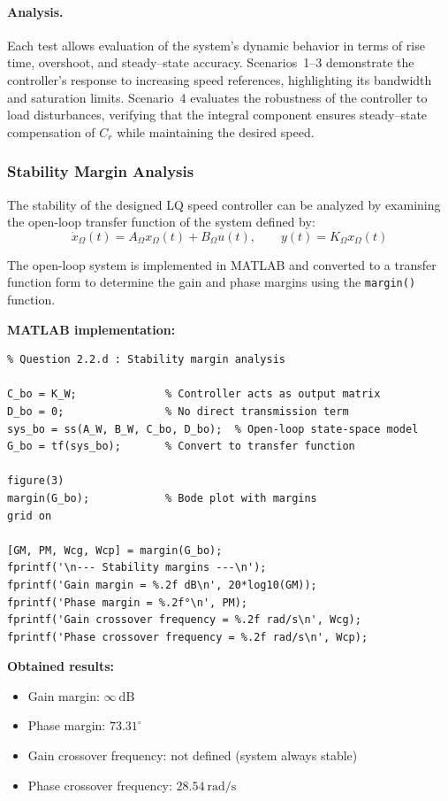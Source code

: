 \documentclass{rapportCS}
\begin{document}
\paragraph{Analysis.}
Each test allows evaluation of the system’s dynamic behavior in terms of rise time, overshoot, and steady–state accuracy.  
Scenarios~1–3 demonstrate the controller’s response to increasing speed references, highlighting its bandwidth and saturation limits.  
Scenario~4 evaluates the robustness of the controller to load disturbances, verifying that the integral component ensures steady–state compensation of $C_r$ while maintaining the desired speed.

\subsubsection{Stability Margin Analysis}

The stability of the designed LQ speed controller can be analyzed by examining the open-loop transfer function of the system defined by:
\begin{equation*}
\dot{x}_\Omega(t) = A_\Omega x_\Omega(t) + B_\Omega u(t),
\qquad
y(t) = K_\Omega x_\Omega(t)
\end{equation*}

The open-loop system is implemented in MATLAB and converted to a transfer function form to determine the gain and phase margins using the \texttt{margin()} function.

\noindent\textbf{MATLAB implementation:}
\begin{verbatim}
% Question 2.2.d : Stability margin analysis

C_bo = K_W;              % Controller acts as output matrix
D_bo = 0;                % No direct transmission term
sys_bo = ss(A_W, B_W, C_bo, D_bo);  % Open-loop state-space model
G_bo = tf(sys_bo);       % Convert to transfer function

figure(3)
margin(G_bo);            % Bode plot with margins
grid on

[GM, PM, Wcg, Wcp] = margin(G_bo);
fprintf('\n--- Stability margins ---\n');
fprintf('Gain margin = %.2f dB\n', 20*log10(GM));
fprintf('Phase margin = %.2f°\n', PM);
fprintf('Gain crossover frequency = %.2f rad/s\n', Wcg);
fprintf('Phase crossover frequency = %.2f rad/s\n', Wcp);
\end{verbatim}

\noindent\textbf{Obtained results:}
\begin{itemize}
    \item Gain margin: $\infty~\mathrm{dB}$
    \item Phase margin: $73.31^{\circ}$
    \item Gain crossover frequency: not defined (system always stable)
    \item Phase crossover frequency: $28.54~\mathrm{rad/s}$
\end{itemize}
\end{document}
